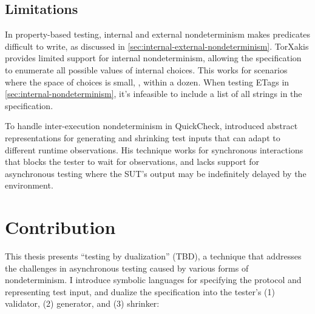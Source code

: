 \subsection{Limitations}
In property-based testing, internal and external nondeterminism makes predicates
difficult to write, as discussed
in \autoref{sec:internal-external-nondeterminism}.  TorXakis provides limited
support for internal nondeterminism, allowing the specification to enumerate all
possible values of internal choices.  This works for scenarios where the space
of choices is small, \eg, within a dozen.  When testing ETags
in \autoref{sec:internal-nondeterminism}, it's infeasible to include a list of
all strings in the specification.

To handle inter-execution nondeterminism in QuickCheck, \citet{Hughes2016}
introduced abstract representations for generating and shrinking test inputs
that can adapt to different runtime observations.  His technique works for
synchronous interactions that blocks the tester to wait for observations, and
lacks support for asynchronous testing where the SUT's output may be
indefinitely delayed by the environment.

\section{Contribution}
\label{sec:contribution}
This thesis presents ``testing by dualization'' (TBD), a technique that
addresses the challenges in asynchronous testing caused by various forms of
nondeterminism.  I introduce symbolic languages for specifying the protocol and
representing test input, and dualize the specification into the tester's (1)
validator, (2) generator, and (3) shrinker:

